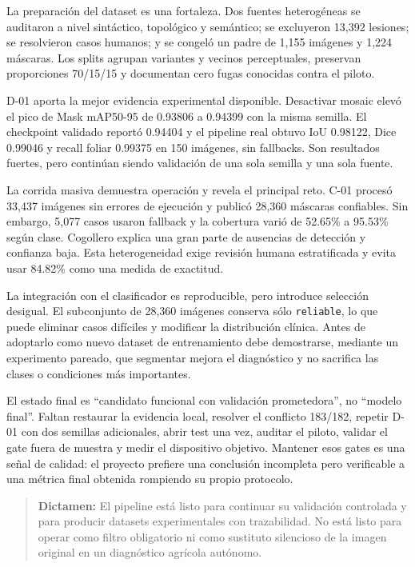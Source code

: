 \documentclass[11pt,a4paper]{article}
\begin{document}
La preparación del dataset es una fortaleza. Dos fuentes heterogéneas se auditaron a nivel sintáctico, topológico y semántico; se excluyeron 13,392 lesiones; se resolvieron casos humanos; y se congeló un padre de 1,155 imágenes y 1,224 máscaras. Los splits agrupan variantes y vecinos perceptuales, preservan proporciones 70/15/15 y documentan cero fugas conocidas contra el piloto.


D-01 aporta la mejor evidencia experimental disponible. Desactivar mosaic elevó el pico de Mask mAP50-95 de 0.93806 a 0.94399 con la misma semilla. El checkpoint validado reportó 0.94404 y el pipeline real obtuvo IoU 0.98122, Dice 0.99046 y recall foliar 0.99375 en 150 imágenes, sin fallbacks. Son resultados fuertes, pero continúan siendo validación de una sola semilla y una sola fuente.


La corrida masiva demuestra operación y revela el principal reto. C-01 procesó 33,437 imágenes sin errores de ejecución y publicó 28,360 máscaras confiables. Sin embargo, 5,077 casos usaron fallback y la cobertura varió de 52.65\% a 95.53\% según clase. Cogollero explica una gran parte de ausencias de detección y confianza baja. Esta heterogeneidad exige revisión humana estratificada y evita usar 84.82\% como una medida de exactitud.


La integración con el clasificador es reproducible, pero introduce selección desigual. El subconjunto de 28,360 imágenes conserva sólo \texttt{reliable}, lo que puede eliminar casos difíciles y modificar la distribución clínica. Antes de adoptarlo como nuevo dataset de entrenamiento debe demostrarse, mediante un experimento pareado, que segmentar mejora el diagnóstico y no sacrifica las clases o condiciones más importantes.


El estado final es “candidato funcional con validación prometedora”, no “modelo final”. Faltan restaurar la evidencia local, resolver el conflicto 183/182, repetir D-01 con dos semillas adicionales, abrir test una vez, auditar el piloto, validar el gate fuera de muestra y medir el dispositivo objetivo. Mantener esos gates es una señal de calidad: el proyecto prefiere una conclusión incompleta pero verificable a una métrica final obtenida rompiendo su propio protocolo.


\begin{quote}\textbf{Dictamen:} El pipeline está listo para continuar su validación controlada y para producir datasets experimentales con trazabilidad. No está listo para operar como filtro obligatorio ni como sustituto silencioso de la imagen original en un diagnóstico agrícola autónomo.\end{quote}
\clearpage
\end{document}
